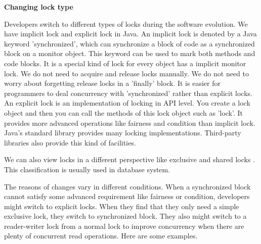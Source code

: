 \documentclass[conference]{IEEEtran}
\begin{document}
\textbf{Changing lock type}

Developers switch to different types of locks during the software evolution. We have implicit lock and explicit lock in Java. An implicit lock is denoted by a Java keyword 'synchronized', which can synchronize a block of code as a synchronized block on a monitor object. This keyword can be used to mark both methods and code blocks. It is a special kind of lock for every object has a implicit monitor lock. We do not need to acquire and release locks manually. We do not need to worry about forgetting release locks in a 'finally' block. It is easier for programmers to deal concurrency with 'synchronized' rather than explicit locks. An explicit lock is an implementation of locking in API level. You create a lock object and then you can call the methods of this lock object such as 'lock'. It provides more advanced operations like fairness and condition than implicit lock. Java's standard library provides many locking implementations. Third-party libraries also provide this kind of facilities.

We can also view locks in a different perspective like exclusive and shared locks \cite{journals/jacm/KedemS83}. This classification is usually used in database system.


The reasons of changes vary in different conditions. When a synchronized block cannot satisfy some advanced requirement like fairness or condition, developers might switch to explicit locks. When they find that they only need a simple exclusive lock, they switch to synchronized block. They also might switch to a reader-writer lock \cite{journals/cacm/CouroisHP71} from a normal lock to improve concurrency when there are plenty of concurrent read operations. Here are some examples.
\end{document}
